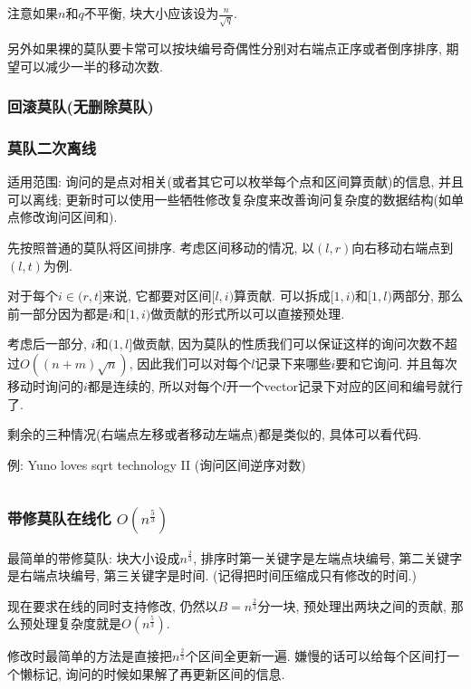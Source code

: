 注意如果$n$和$q$不平衡, 块大小应该设为$\frac n {\sqrt q}$.

另外如果裸的莫队要卡常可以按块编号奇偶性分别对右端点正序或者倒序排序, 期望可以减少一半的移动次数.


\subsubsection{回滚莫队(无删除莫队)}

\subsubsection{莫队二次离线}

适用范围: 询问的是点对相关(或者其它可以枚举每个点和区间算贡献)的信息, 并且可以离线; 更新时可以使用一些牺牲修改复杂度来改善询问复杂度的数据结构(如单点修改询问区间和).

先按照普通的莫队将区间排序. 考虑区间移动的情况, 以$(l, r)$向右移动右端点到$(l, t)$为例.

对于每个$i \in (r, t]$来说, 它都要对区间$[l, i)$算贡献. 可以拆成$[1, i)$和$[1, l)$两部分, 那么前一部分因为都是$i$和$[1, i)$做贡献的形式所以可以直接预处理.

考虑后一部分, $i$和$(1, l]$做贡献, 因为莫队的性质我们可以保证这样的询问次数不超过$O((n + m)\sqrt n)$, 因此我们可以对每个$l$记录下来哪些$i$要和它询问. 并且每次移动时询问的$i$都是连续的, 所以对每个$l$开一个vector记录下对应的区间和编号就行了.

剩余的三种情况(右端点左移或者移动左端点)都是类似的, 具体可以看代码.

例: Yuno loves sqrt technology II (询问区间逆序对数)

\inputminted{cpp}{../src/datastructure/莫队二次离线.cpp}

\subsubsection{带修莫队在线化 $O(n ^ {\frac 5 3})$}

最简单的带修莫队: 块大小设成$n^{\frac 2 3}$, 排序时第一关键字是左端点块编号, 第二关键字是右端点块编号, 第三关键字是时间. (记得把时间压缩成只有修改的时间.)

现在要求在线的同时支持修改, 仍然以$B = n^{\frac 2 3}$分一块, 预处理出两块之间的贡献, 那么预处理复杂度就是$O(n ^ {\frac 5 3})$.

修改时最简单的方法是直接把$n^{\frac 2 3}$个区间全更新一遍. 嫌慢的话可以给每个区间打一个懒标记, 询问的时候如果解了再更新区间的信息.

